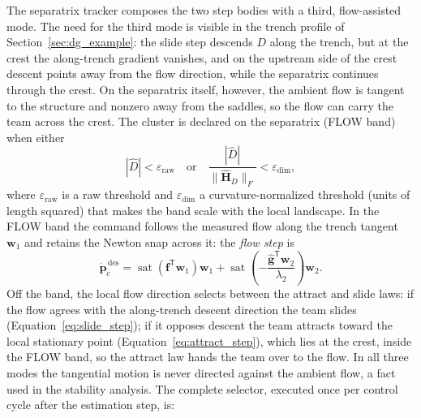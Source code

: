 \documentclass[12pt, letterpaper, oneside]{report}
\begin{document}
The separatrix tracker composes the two step bodies with a third,
flow-assisted mode. The need for the third mode is visible in the trench
profile of Section~\ref{sec:dg_example}: the slide step descends $D$
along the trench, but at the crest the along-trench gradient vanishes,
and on the upstream side of the crest descent points away from the flow
direction, while the separatrix continues through the crest. On the
separatrix itself, however, the ambient flow is tangent to the structure
and nonzero away from the saddles, so the flow can carry the team across
the crest. The cluster is declared on the separatrix (FLOW band) when
either
\begin{equation}
|\hat D| < \varepsilon_{\text{raw}} \quad\text{or}\quad \frac{|\hat D|}{\lVert\hat{\mathbf{H}}_D\rVert_F} < \varepsilon_{\text{dim}},
\label{eq:flow_band}
\end{equation}
where $\varepsilon_{\text{raw}}$ is a raw threshold and
$\varepsilon_{\text{dim}}$ a curvature-normalized threshold (units of
length squared) that makes the band scale with the local landscape. In
the FLOW band the command follows the measured flow along the trench
tangent $\mathbf{w}_1$ and retains the Newton snap across it: the
\emph{flow step} is
\begin{equation}
\dot{\mathbf{p}}_c^{\,\text{des}} = \operatorname{sat}\!\left(\mathbf{f}^{\mathsf T}\mathbf{w}_1\right)\mathbf{w}_1 + \operatorname{sat}\!\left(-\frac{\hat{\mathbf{g}}^{\mathsf T}\mathbf{w}_2}{\lambda_2}\right)\mathbf{w}_2.
\label{eq:flow_step}
\end{equation}
Off the band, the local flow direction selects between the attract and
slide laws: if the flow agrees with the along-trench descent direction
the team slides (Equation~\eqref{eq:slide_step}); if it opposes descent
the team attracts toward the local stationary point
(Equation~\eqref{eq:attract_step}), which lies at the crest, inside the
FLOW band, so the attract law hands the team over to the flow. In all
three modes the tangential motion is never directed against the ambient
flow, a fact used in the stability analysis. The complete selector,
executed once per control cycle after the estimation step, is:
\end{document}
